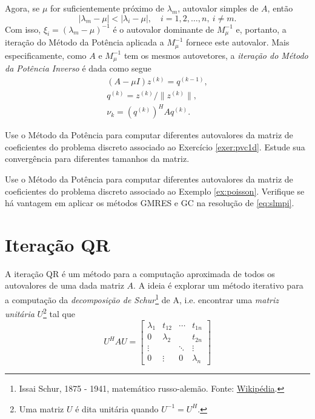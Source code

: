 Agora, se $\mu$ for suficientemente próximo de $\lambda_m$, autovalor simples de $A$, então
\begin{equation}
  |\lambda_m-\mu| < |\lambda_i-\mu|,\quad i=1,2,\dotsc,n,~i\neq m.
\end{equation}
Com isso, $\xi_i=(\lambda_m-\mu)^{-1}$ é o autovalor dominante de $M_\mu^{-1}$ e, portanto, a iteração do Método da Potência aplicada a $M_\mu^{-1}$ fornece este autovalor. Mais especificamente, como $A$ e $M_\mu^{-1}$ tem os  mesmos autovetores, a \emph{iteração do Método da Potência Inverso} é dada como segue
\begin{gather}
  (A-\mu I)z^{(k)} = q^{(k-1)}, \label{eq:slmpi}\\
  q^{(k)}=z^{(k)}/\|z^{(k)}\|,\\
  \nu_k = (q^{(k)})^H A q^{(k)}.
\end{gather}


\begin{exer}
  Use o Método da Potência para computar diferentes autovalores da matriz de coeficientes do problema discreto associado ao Exercício \ref{exer:pvc1d}. Estude sua convergência para diferentes tamanhos da matriz. 
\end{exer}

\begin{exer}
  Use o Método da Potência para computar diferentes autovalores da matriz de coeficientes do problema discreto associado ao Exemplo \ref{ex:poisson}. Verifique se há vantagem em aplicar os métodos GMRES e GC na resolução de \eqref{eq:slmpi}.
\end{exer}

\section{Iteração QR}\label{cap_autoval_sec_qr}
\badgeRevisar

A iteração QR é um método para a computação aproximada de todos os autovalores de uma dada matriz $A$. A ideia é explorar um método iterativo para a computação da \emph{decomposição de Schur}\footnote{Issai Schur, 1875 - 1941, matemático russo-alemão. Fonte: \href{https://pt.wikipedia.org/wiki/Issai_Schur}{Wikipédia}.} de A, i.e. encontrar uma \emph{matriz unitária} $U$\footnote{Uma matriz $U$ é dita unitária quando $U^{-1} = U^H$.} tal que
\begin{equation}
  U^{H}AU =
  \begin{bmatrix}
    \lambda_1 & t_{12} & \cdots & t_{1n}\\
    0 & \lambda_2 & & t_{2n}\\
    \vdots & & \ddots & \vdots\\
    0 & \vdots & 0 & \lambda_n
  \end{bmatrix}
\end{equation}

